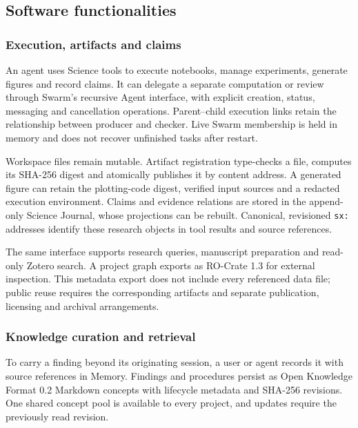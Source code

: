 \documentclass[preprint,12pt,a4paper]{elsarticle}
\begin{document}
\subsection{Software functionalities}
\label{sec:coordination}

\subsubsection{Execution, artifacts and claims}

An agent uses Science tools to execute notebooks, manage experiments, generate figures and record
claims. It can delegate a separate computation or review through Swarm's recursive Agent
interface, with explicit creation, status, messaging and cancellation operations. Parent--child
execution links retain the relationship between producer and checker. Live Swarm membership is
held in memory and does not recover unfinished tasks after restart.

Workspace files remain mutable. Artifact registration type-checks a file, computes its SHA-256
digest and atomically publishes it by content address. A generated figure can retain the
plotting-code digest, verified input sources and a redacted execution environment. Claims and
evidence relations are stored in the append-only Science Journal, whose projections can be
rebuilt. Canonical, revisioned \texttt{sx:} addresses identify these research objects in tool
results and source references.

The same interface supports research queries, manuscript preparation and read-only Zotero
search. A project graph exports as RO-Crate 1.3 for external inspection. This metadata export
does not include every referenced data file; public reuse requires the corresponding artifacts
and separate publication, licensing and archival arrangements.

\subsubsection{Knowledge curation and retrieval}
\label{sec:memory}

To carry a finding beyond its originating session, a user or agent records it with source
references in Memory. Findings and procedures persist as Open Knowledge Format 0.2 Markdown
concepts with lifecycle metadata and SHA-256 revisions. One shared concept pool is available to
every project, and updates require the previously read revision.
\end{document}
